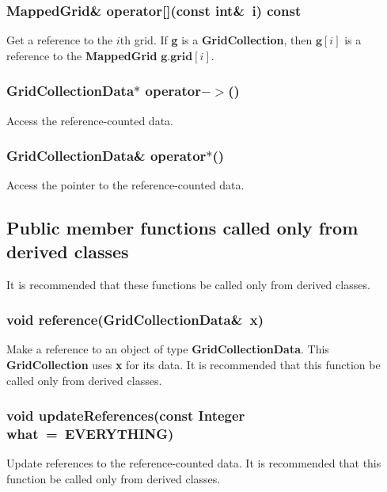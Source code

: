 \documentclass{article}
\begin{document}
  \subsubsection{MappedGrid\& operator[](const int\&~i) const}
  \label{GridCollection::operator[](i)}
    Get a reference to the $i$th grid.
    If \textbf{g} is a \textbf{GridCollection}, then $\textbf{g}[i]$
    is a reference to the \textbf{MappedGrid} $\textbf{g}.\textbf{grid}[i]$.

  \subsubsection{GridCollectionData$*$ operator${-}{>}$()}
  \label{GridCollection::operator->()}
    Access the reference-counted data.

  \subsubsection{GridCollectionData\& operator$*$()}
  \label{GridCollection::operator*()}
    Access the pointer to the reference-counted data.

\subsection{Public member functions called only from derived classes}
\label{GridCollection::PublicDerivedClassMemberFunctions}

It is recommended that these functions be called only from derived classes.

  \subsubsection{void reference(GridCollectionData\&~x)}
  \label{GridCollection::reference(GridCollectionData_x)}
    Make a reference to an object of type \textbf{GridCollectionData}.
    This \textbf{GridCollection} uses \textbf{x} for its data.
    It is recommended that this function be called only from derived classes.

  \subsubsection{void updateReferences(const Integer what~=~EVERYTHING)}
  \label{GridCollection::updateReferences(what)}
    Update references to the reference-counted data.
    It is recommended that this function be called only from derived classes.
\end{document}
